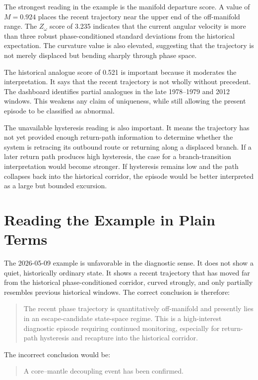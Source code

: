 \documentclass[11pt]{article}
\begin{document}
The strongest reading in the example is the manifold departure score. A value of \(M=0.924\) places the recent trajectory near the upper end of the off-manifold range. The \(Z_{\omega}\) score of 3.235 indicates that the current angular velocity is more than three robust phase-conditioned standard deviations from the historical expectation. The curvature value is also elevated, suggesting that the trajectory is not merely displaced but bending sharply through phase space.

The historical analogue score of 0.521 is important because it moderates the interpretation. It says that the recent trajectory is not wholly without precedent. The dashboard identifies partial analogues in the late 1978--1979 and 2012 windows. This weakens any claim of uniqueness, while still allowing the present episode to be classified as abnormal.

The unavailable hysteresis reading is also important. It means the trajectory has not yet provided enough return-path information to determine whether the system is retracing its outbound route or returning along a displaced branch. If a later return path produces high hysteresis, the case for a branch-transition interpretation would become stronger. If hysteresis remains low and the path collapses back into the historical corridor, the episode would be better interpreted as a large but bounded excursion.

\section{Reading the Example in Plain Terms}

The 2026-05-09 example is unfavorable in the diagnostic sense. It does not show a quiet, historically ordinary state. It shows a recent trajectory that has moved far from the historical phase-conditioned corridor, curved strongly, and only partially resembles previous historical windows. The correct conclusion is therefore:

\begin{quote}
The recent phase trajectory is quantitatively off-manifold and presently lies in an escape-candidate state-space regime. This is a high-interest diagnostic episode requiring continued monitoring, especially for return-path hysteresis and recapture into the historical corridor.
\end{quote}

The incorrect conclusion would be:

\begin{quote}
A core--mantle decoupling event has been confirmed.
\end{quote}
\end{document}
